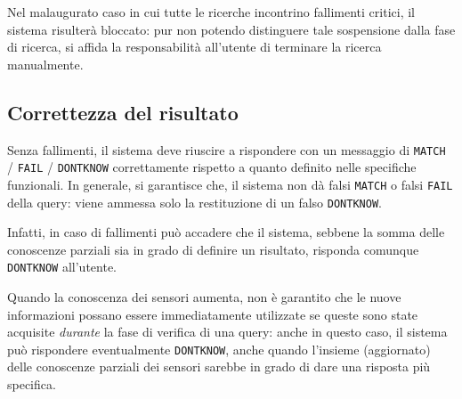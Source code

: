 \documentclass{llncs}
\begin{document}
Nel malaugurato caso in cui tutte le ricerche incontrino
fallimenti critici, il sistema risulterà bloccato: pur non potendo
distinguere tale sospensione dalla fase di ricerca, si affida
la responsabilità all'utente di terminare la ricerca manualmente.

\subsection{Correttezza del risultato}
Senza fallimenti, il sistema deve riuscire a rispondere con un messaggio di
\texttt{MATCH} / \texttt{FAIL} / \texttt{DONTKNOW} correttamente
rispetto a quanto definito nelle specifiche funzionali.
In generale, si garantisce che,
il sistema non dà falsi \texttt{MATCH} o falsi \texttt{FAIL} della query:
viene ammessa solo la restituzione di un falso \texttt{DONTKNOW}.

Infatti,
in caso di fallimenti può accadere che il sistema, sebbene la somma
delle conoscenze parziali sia in grado di definire un risultato,
risponda comunque \texttt{DONTKNOW} all'utente.

Quando la conoscenza dei sensori aumenta,
non è garantito che le nuove informazioni possano essere immediatamente
utilizzate se queste sono state acquisite \emph{durante} la fase di verifica
di una query: anche in questo caso, il sistema può rispondere eventualmente
\texttt{DONTKNOW}, anche quando l'insieme (aggiornato) delle conoscenze parziali
dei sensori sarebbe in grado di dare una risposta più specifica.

\end{document}
